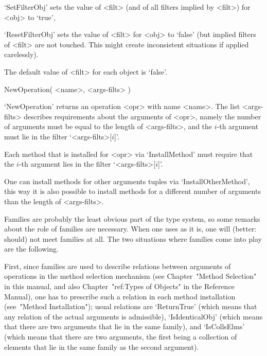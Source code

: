 `SetFilterObj' sets the value of <filt> (and of all filters implied by
<filt>) for <obj> to `true',

`ResetFilterObj' sets the value of <filt> for <obj> to `false' (but implied
filters of <filt> are not touched. This might create inconsistent situations
if applied carelessly).

The default value of <filt> for each object is `false'.




\>NewOperation( <name>, <args-filts> )

`NewOperation' returns an operation <opr> with name <name>.
The list <args-filts> describes requirements about the arguments
of <opr>, namely the number of arguments must be equal to the length of
<args-filts>, and the $i$-th argument must lie in the filter
`<args-filts>[$i$]'.

Each method that is installed for <opr> via `InstallMethod' must require
that the $i$-th argument lies in the filter `<args-filts>[$i$]'.

One can install methods for other arguments tuples via
`InstallOtherMethod',
this way it is also possible to install methods for a different number
of arguments than the length of <args-filts>.



Families are probably the least obvious part of the {\GAP} type system,
so some remarks about the role of families are necessary.
When one uses {\GAP} as it is, one will (better: should) not meet
families at all.
The two situations where families come into play are the following.

First, since families are used to describe relations between arguments of
operations in the method selection mechanism
(see Chapter~"Method Selection" in this manual,
and also Chapter~"ref:Types of Objects" in the Reference Manual),
one has to prescribe such a relation in each method installation
(see~"Method Installation");
usual relations are `ReturnTrue' (which means that any relation of the
actual arguments is admissible), `IsIdenticalObj' (which means that
there are two arguments that lie in the same family),
and `IsCollsElms' (which means that there are two arguments,
the first being a collection of elements that lie in the same family
as the second argument).

